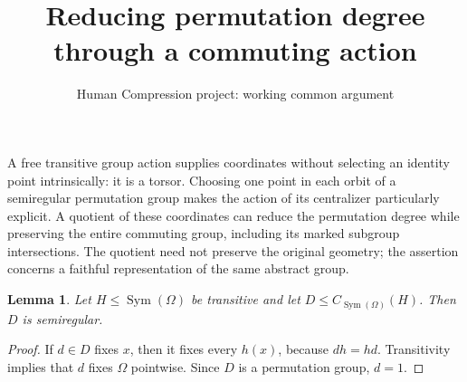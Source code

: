 \documentclass[11pt,a4paper]{article}
\title{Reducing permutation degree through a commuting action}
\author{Human Compression project: working common argument}
\date{}
\newtheorem{lemma}[theorem]{Lemma}
\newcommand{\Sym}{\operatorname{Sym}}
\begin{document}
\maketitle

A free transitive group action supplies coordinates without selecting an
identity point intrinsically: it is a torsor. Choosing one point in each
orbit of a semiregular permutation group makes the action of its centralizer
particularly explicit. A quotient of these coordinates can reduce the
permutation degree while preserving the entire commuting group, including
its marked subgroup intersections. The quotient need not preserve the
original geometry; the assertion concerns a faithful representation of
the same abstract group.

\begin{lemma}\label{free}
Let $H\leq\Sym(\Omega)$ be transitive and let
$D\leq C_{\Sym(\Omega)}(H)$. Then $D$ is semiregular.
\end{lemma}
\begin{proof}
If $d\in D$ fixes $x$, then it fixes every $h(x)$, because $dh=hd$.
Transitivity implies that $d$ fixes $\Omega$ pointwise. Since $D$ is a
permutation group, $d=1$.
\end{proof}
\end{document}
